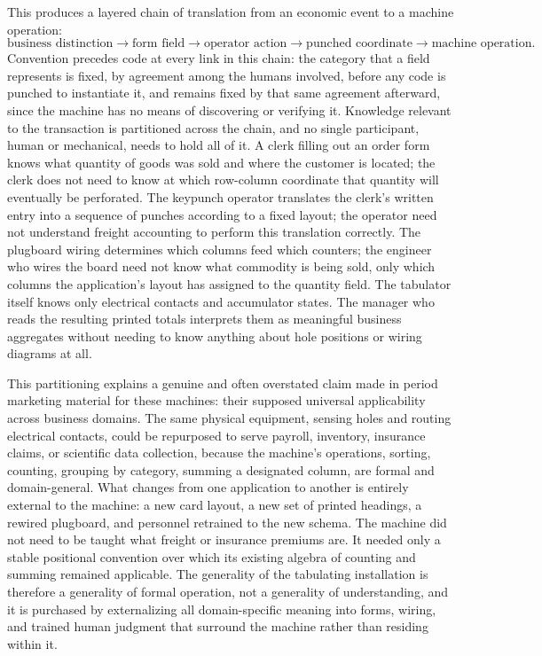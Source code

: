 \documentclass[11pt]{article}
\begin{document}
This produces a layered chain of translation from an economic event to a machine operation:
\[
\text{business distinction} \longrightarrow \text{form field} \longrightarrow \text{operator action} \longrightarrow \text{punched coordinate} \longrightarrow \text{machine operation}.
\]
Convention precedes code at every link in this chain: the category that a field represents is fixed, by agreement among the humans involved, before any code is punched to instantiate it, and remains fixed by that same agreement afterward, since the machine has no means of discovering or verifying it. Knowledge relevant to the transaction is partitioned across the chain, and no single participant, human or mechanical, needs to hold all of it. A clerk filling out an order form knows what quantity of goods was sold and where the customer is located; the clerk does not need to know at which row-column coordinate that quantity will eventually be perforated. The keypunch operator translates the clerk's written entry into a sequence of punches according to a fixed layout; the operator need not understand freight accounting to perform this translation correctly. The plugboard wiring determines which columns feed which counters; the engineer who wires the board need not know what commodity is being sold, only which columns the application's layout has assigned to the quantity field. The tabulator itself knows only electrical contacts and accumulator states. The manager who reads the resulting printed totals interprets them as meaningful business aggregates without needing to know anything about hole positions or wiring diagrams at all.

This partitioning explains a genuine and often overstated claim made in period marketing material for these machines: their supposed universal applicability across business domains. The same physical equipment, sensing holes and routing electrical contacts, could be repurposed to serve payroll, inventory, insurance claims, or scientific data collection, because the machine's operations, sorting, counting, grouping by category, summing a designated column, are formal and domain-general. What changes from one application to another is entirely external to the machine: a new card layout, a new set of printed headings, a rewired plugboard, and personnel retrained to the new schema. The machine did not need to be taught what freight or insurance premiums are. It needed only a stable positional convention over which its existing algebra of counting and summing remained applicable. The generality of the tabulating installation is therefore a generality of formal operation, not a generality of understanding, and it is purchased by externalizing all domain-specific meaning into forms, wiring, and trained human judgment that surround the machine rather than residing within it.
\end{document}
